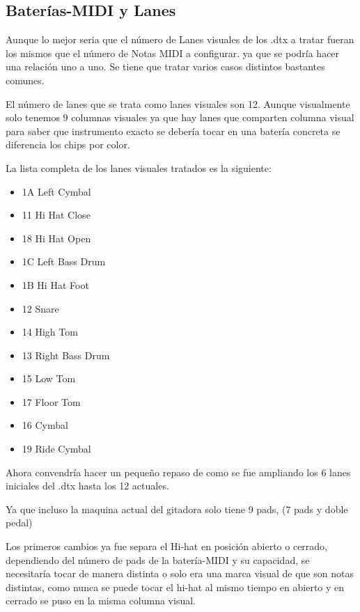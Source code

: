 \documentclass[a4paper,11pt,oneside]{book}
\begin{document}
\subsection{Baterías-MIDI y Lanes}
Aunque lo mejor seria que el número de Lanes visuales de los .dtx a tratar fueran los mismos que el número de Notas MIDI a configurar. ya que se podría hacer una relación uno a uno. Se tiene que tratar varios casos distintos bastantes comunes.

El número de lanes que se trata como lanes visuales son 12. Aunque visualmente solo tenemos 9 columnas visuales ya que hay lanes que comparten columna visual para saber que instrumento exacto se debería tocar en una batería concreta se diferencia los chips por color.

La lista completa de los lanes visuales tratados es la siguiente:

\begin{itemize}
   \item 1A Left Cymbal
   \item 11 Hi Hat Close
   \item 18 Hi Hat Open
   \item 1C Left Bass Drum
   \item 1B Hi Hat Foot
   \item 12 Snare
   \item 14 High Tom
   \item 13 Right Bass Drum
   \item 15 Low Tom
   \item 17 Floor Tom
   \item 16 Cymbal
   \item 19 Ride Cymbal
 \end{itemize}

Ahora convendría hacer un pequeño repaso de como se fue ampliando los 6 lanes iniciales del .dtx hasta los 12 actuales.

Ya que incluso la maquina actual del gitadora solo tiene 9 pads, (7 pads y doble pedal)

Los primeros cambios ya fue separa el Hi-hat en posición abierto o cerrado, dependiendo del número de pads de la batería-MIDI y su capacidad, se necesitaría tocar de manera distinta o solo era una marca visual de que son notas distintas, como nunca se puede tocar el hi-hat al mismo tiempo en abierto y en cerrado se puso en la misma columna visual.
\end{document}
